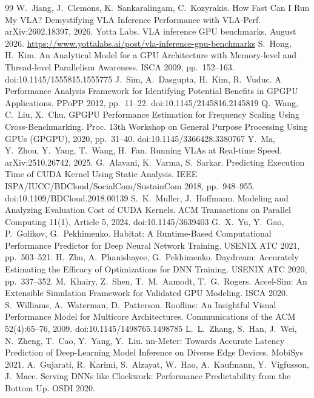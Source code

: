 \documentclass[10pt,twocolumn]{article}
\begin{document}
\begin{thebibliography}{99}
 W.~Jiang, J.~Clemons, K.~Sankaralingam, C.~Kozyrakis. How Fast Can I Run My
VLA? Demystifying VLA Inference Performance with VLA-Perf. arXiv:2602.18397, 2026.
 Yotta Labs. VLA inference GPU benchmarks, August 2026.
\url{https://www.yottalabs.ai/post/vla-inference-gpu-benchmarks}
 S.~Hong, H.~Kim. An Analytical Model for a GPU Architecture with
Memory-level and Thread-level Parallelism Awareness. ISCA 2009, pp.~152--163.
doi:10.1145/1555815.1555775
 J.~Sim, A.~Dasgupta, H.~Kim, R.~Vuduc. A Performance Analysis Framework for
Identifying Potential Benefits in GPGPU Applications. PPoPP 2012, pp.~11--22.
doi:10.1145/2145816.2145819
 Q.~Wang, C.~Liu, X.~Chu. GPGPU Performance Estimation for Frequency Scaling
Using Cross-Benchmarking. Proc. 13th Workshop on General Purpose Processing Using GPUs
(GPGPU), 2020, pp.~31--40. doi:10.1145/3366428.3380767
 Y.~Ma, Y.~Zhou, Y.~Yang, T.~Wang, H.~Fan. Running VLAs at Real-time Speed.
arXiv:2510.26742, 2025.
 G.~Alavani, K.~Varma, S.~Sarkar. Predicting Execution Time of CUDA Kernel
Using Static Analysis. IEEE ISPA/IUCC/BDCloud/SocialCom/SustainCom 2018, pp.~948--955.
doi:10.1109/BDCloud.2018.00139
 S.~K.~Muller, J.~Hoffmann. Modeling and Analyzing Evaluation Cost of CUDA
Kernels. ACM Transactions on Parallel Computing 11(1), Article 5, 2024. doi:10.1145/3639403
 G.~X.~Yu, Y.~Gao, P.~Golikov, G.~Pekhimenko. Habitat: A Runtime-Based
Computational Performance Predictor for Deep Neural Network Training. USENIX ATC 2021,
pp.~503--521.
 H.~Zhu, A.~Phanishayee, G.~Pekhimenko. Daydream: Accurately Estimating the
Efficacy of Optimizations for DNN Training. USENIX ATC 2020, pp.~337--352.
 M.~Khairy, Z.~Shen, T.~M.~Aamodt, T.~G.~Rogers. Accel-Sim: An Extensible
Simulation Framework for Validated GPU Modeling. ISCA 2020.
 S.~Williams, A.~Waterman, D.~Patterson. Roofline: An Insightful Visual
Performance Model for Multicore Architectures. Communications of the ACM 52(4):65--76, 2009.
doi:10.1145/1498765.1498785
 L.~L.~Zhang, S.~Han, J.~Wei, N.~Zheng, T.~Cao, Y.~Yang, Y.~Liu. nn-Meter:
Towards Accurate Latency Prediction of Deep-Learning Model Inference on Diverse Edge Devices.
MobiSys 2021.
 A.~Gujarati, R.~Karimi, S.~Alzayat, W.~Hao, A.~Kaufmann, Y.~Vigfusson,
J.~Mace. Serving DNNs like Clockwork: Performance Predictability from the Bottom Up. OSDI 2020.

\end{thebibliography}
\end{document}
